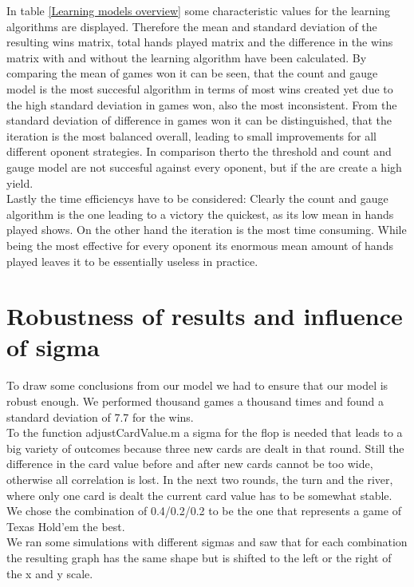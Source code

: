 \documentclass[11pt]{article}
\begin{document}
In table \ref{Learning models overview} some characteristic values for the learning algorithms are displayed. Therefore the mean and standard deviation of the resulting wins matrix, total hands played matrix and the difference in the wins matrix with and without the learning algorithm have been calculated. By comparing the mean of games won it can be seen, that the count and gauge model is the most succesful algorithm in terms of most wins created yet due to the high standard deviation in games won, also the most inconsistent. From the standard deviation of difference in games won it can be distinguished, that the iteration is the most balanced overall, leading to small improvements for all different oponent strategies. In comparison therto the threshold and count and gauge model are not succesful against every oponent, but if the are create a high yield. \\

Lastly the time efficiencys have to be considered: Clearly the count and gauge algorithm is the one leading to a victory the quickest, as its low mean in hands played shows. On the other hand the iteration is the most time consuming. While being the most effective for every oponent its enormous mean amount of hands played leaves it to be essentially useless in practice.


\section{Robustness of results and influence of sigma}

To draw some conclusions from our model we had to ensure that our model is robust enough. We performed thousand games a thousand times and found a standard deviation of 7.7 for the wins.\\

To the function adjustCardValue.m a sigma for the flop is needed that leads to a big variety of outcomes because three new cards are dealt in that round. Still the difference in the card value before and after new cards cannot be too wide, otherwise all correlation is lost. In the next two rounds, the turn and the river, where only one card is dealt the current card value has to be somewhat stable.\\

We chose the combination of 0.4/0.2/0.2 to be the one that represents a game of Texas Hold'em the best. \\

We ran some simulations with different sigmas and saw that for each combination the resulting graph has the same shape but is shifted to the left or the right of the x and y scale.
\end{document}
